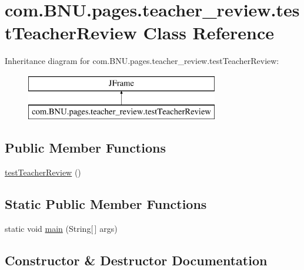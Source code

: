 \hypertarget{classcom_1_1_b_n_u_1_1pages_1_1teacher__review_1_1test_teacher_review}{}\section{com.\+B\+N\+U.\+pages.\+teacher\+\_\+review.\+test\+Teacher\+Review Class Reference}
\label{classcom_1_1_b_n_u_1_1pages_1_1teacher__review_1_1test_teacher_review}
Inheritance diagram for com.\+B\+N\+U.\+pages.\+teacher\+\_\+review.\+test\+Teacher\+Review\+:\begin{figure}[H]
\begin{center}
\leavevmode
\includegraphics[height=2.000000cm]{classcom_1_1_b_n_u_1_1pages_1_1teacher__review_1_1test_teacher_review}
\end{center}
\end{figure}
\subsection*{Public Member Functions}
\begin{DoxyCompactItemize}
\item 
\mbox{\hyperlink{classcom_1_1_b_n_u_1_1pages_1_1teacher__review_1_1test_teacher_review_afd9b2e2c4c5ade504f0f7780c05e9be8}{test\+Teacher\+Review}} ()
\end{DoxyCompactItemize}
\subsection*{Static Public Member Functions}
\begin{DoxyCompactItemize}
\item 
static void \mbox{\hyperlink{classcom_1_1_b_n_u_1_1pages_1_1teacher__review_1_1test_teacher_review_aecd53fbb6705fba02fd94f05b0813f47}{main}} (String\mbox{[}$\,$\mbox{]} args)
\end{DoxyCompactItemize}


\subsection{Constructor \& Destructor Documentation}
\mbox{\label{classcom_1_1_b_n_u_1_1pages_1_1teacher__review_1_1test_teacher_review_afd9b2e2c4c5ade504f0f7780c05e9be8}} 

